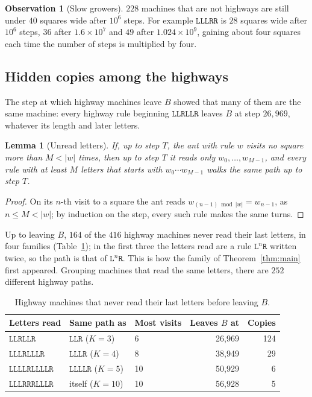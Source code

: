\documentclass[11pt,a4paper]{article}
\newtheorem{lemma}[theorem]{Lemma}
\theoremstyle{definition}
\newtheorem{observation}[theorem]{Observation}
\theoremstyle{remark}
\newcommand{\Lw}{\mathtt{L}}
\newcommand{\Rw}{\mathtt{R}}
\begin{document}
\begin{observation}[Slow growers]\label{obs:slow}
$228$ machines that are not highways are still under $40$ squares wide after $10^6$ steps. For example
$\Lw\Lw\Lw\Rw\Rw$ is $28$ squares wide after $10^6$ steps, $36$ after $1.6 \times 10^7$ and $49$ after
$1.024 \times 10^9$, gaining about four squares each time the number of steps is multiplied by four.
\end{observation}

\subsection{Hidden copies among the highways}\label{sec:copies}

The step at which highway machines leave $B$ showed that many of them are the same machine: every highway rule
beginning $\Lw\Lw\Rw\Lw\Lw\Rw$ leaves $B$ at step $26{,}969$, whatever its length and later letters.

\begin{lemma}[Unread letters]\label{lem:prefix}
If, up to step $T$, the ant with rule $w$ visits no square more than $M < |w|$ times, then up to step $T$ it reads
only $w_0, \dots, w_{M-1}$, and every rule with at least $M$ letters that starts with $w_0 \cdots w_{M-1}$ walks
the same path up to step $T$.
\end{lemma}

\begin{proof}
On its $n$-th visit to a square the ant reads $w_{(n-1) \bmod |w|} = w_{n-1}$, as $n \le M < |w|$; by induction on
the step, every such rule makes the same turns.
\end{proof}

Up to leaving $B$, $164$ of the $416$ highway machines never read their last letters, in four families
(Table~\ref{tab:copies}); in the first three the letters read are a rule $\Lw^{n}\Rw$ written twice, so the path is
that of $\Lw^{n}\Rw$. This is how the family of Theorem~\ref{thm:main} first appeared. Grouping machines that
read the same letters, there are $252$ different highway paths.

\begin{table}[ht]
\centering
\caption{Highway machines that never read their last letters before leaving $B$.}\label{tab:copies}
\begin{tabular}{@{}lllrr@{}}
\toprule
Letters read & Same path as & Most visits & Leaves $B$ at & Copies\\
\midrule
$\Lw\Lw\Rw\Lw\Lw\Rw$ & $\Lw\Lw\Rw$ ($K=3$) & 6 & 26{,}969 & 124\\
$\Lw\Lw\Lw\Rw\Lw\Lw\Lw\Rw$ & $\Lw\Lw\Lw\Rw$ ($K=4$) & 8 & 38{,}949 & 29\\
$\Lw\Lw\Lw\Lw\Rw\Lw\Lw\Lw\Lw\Rw$ & $\Lw\Lw\Lw\Lw\Rw$ ($K=5$) & 10 & 50{,}929 & 6\\
$\Lw\Lw\Lw\Rw\Rw\Rw\Lw\Lw\Lw\Rw$ & itself ($K=10$) & 10 & 56{,}928 & 5\\
\bottomrule
\end{tabular}
\end{table}
\end{document}
